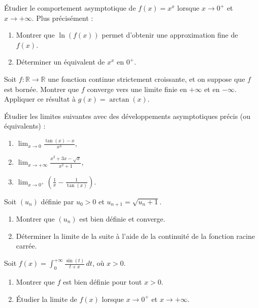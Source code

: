 \begin{exercice}
Étudier le comportement asymptotique de \(f(x) = x^x\) lorsque \(x \to 0^+\) et \(x \to +\infty\). Plus précisément :
\begin{enumerate}
    \item Montrer que \(\ln(f(x))\) permet d’obtenir une approximation fine de \(f(x)\).
    \item Déterminer un équivalent de \(x^x\) en \(0^+\).
\end{enumerate}
\end{exercice}

\begin{exercice}
Soit \(f : \mathbb{R} \to \mathbb{R}\) une fonction continue strictement croissante, et on suppose que \(f\) est bornée. Montrer que \(f\) converge vers une limite finie en \(+\infty\) et en \(-\infty\). Appliquer ce résultat à \(g(x) = \arctan(x)\).
\end{exercice}

\begin{exercice}
Étudier les limites suivantes avec des développements asymptotiques précis (ou équivalents) :
\begin{enumerate}
    \item \(\lim_{x \to 0} \frac{\tan(x) - x}{x^3}\),
    \item \(\lim_{x \to +\infty} \frac{x^2 + 3x - \sqrt{x}}{x^2+1}\),
    \item \(\lim_{x \to 0^+} \left(\frac{1}{x} - \frac{1}{\tan(x)}\right)\).
\end{enumerate}
\end{exercice}

\begin{exercice}
Soit \((u_n)\) définie par \(u_0 > 0\) et \(u_{n+1} = \sqrt{u_n + 1}\).
\begin{enumerate}
    \item Montrer que \((u_n)\) est bien définie et converge.
    \item Déterminer la limite de la suite à l’aide de la continuité de la fonction racine carrée.
\end{enumerate}
\end{exercice}

\begin{exercice}
Soit \(f(x) = \int_0^{+\infty} \frac{\sin(t)}{t+x} \, dt\), où \(x > 0\).
\begin{enumerate}
    \item Montrer que \(f\) est bien définie pour tout \(x > 0\).
    \item Étudier la limite de \(f(x)\) lorsque \(x \to 0^+\) et \(x \to +\infty\).
\end{enumerate}
\end{exercice}

